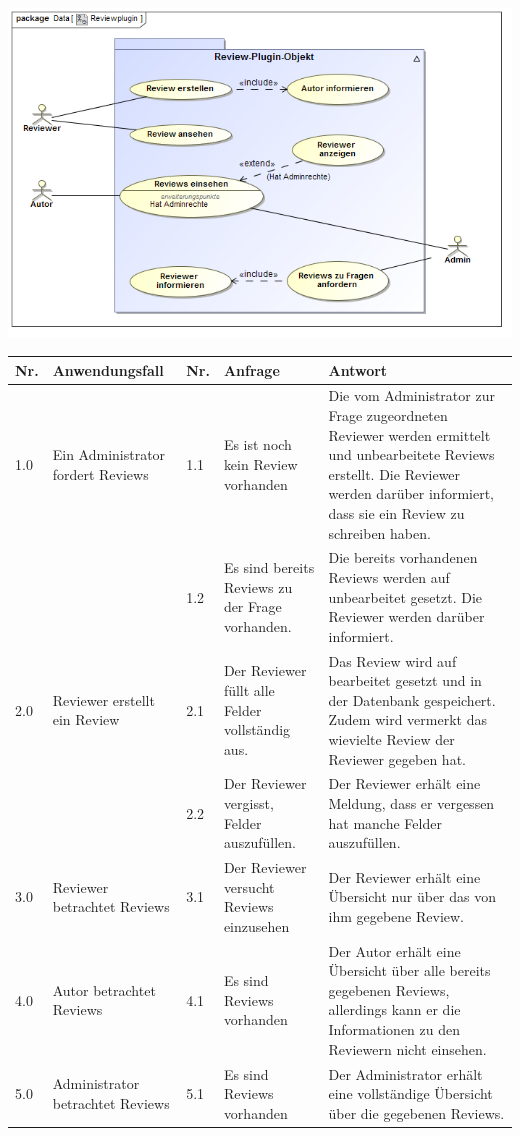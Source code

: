 \documentclass[a4paper]{scrreprt}
\begin{document}
\includegraphics[width=1.0\textwidth]{Use_Case_Diagram__Reviewplugin.png}
\label{Review}

\begin{tabular}{|p{0.5cm}|p{3cm}|p{0.5cm}|p{4cm}|p{4.5cm}|}\hline
Nr. & Anwendungsfall & Nr. & Anfrage & Antwort\\\hline
1.0 & Ein Administrator fordert Reviews & 1.1 & Es ist noch kein Review vorhanden & Die vom Administrator zur Frage zugeordneten Reviewer werden ermittelt und unbearbeitete Reviews erstellt. Die Reviewer werden darüber informiert, dass sie ein Review zu schreiben haben.\\\hline
&&1.2 & Es sind bereits Reviews zu der Frage vorhanden. & Die bereits vorhandenen Reviews werden auf unbearbeitet gesetzt. Die Reviewer werden darüber informiert.\\\hline
2.0 & Reviewer erstellt ein Review & 2.1 & Der Reviewer füllt alle Felder vollständig aus. & Das Review wird auf bearbeitet gesetzt und in der Datenbank gespeichert. Zudem wird vermerkt das wievielte Review der Reviewer gegeben hat.\\\hline
&&2.2 & Der Reviewer vergisst, Felder auszufüllen. & Der Reviewer erhält eine Meldung, dass er vergessen hat manche Felder auszufüllen. \\\hline
3.0 & Reviewer betrachtet Reviews & 3.1 & Der Reviewer versucht Reviews einzusehen & Der Reviewer erhält eine Übersicht nur über das von ihm gegebene Review. \\\hline
4.0 & Autor betrachtet Reviews & 4.1 & Es sind Reviews vorhanden & Der Autor erhält eine Übersicht über alle bereits gegebenen Reviews, allerdings kann er die Informationen zu den Reviewern nicht einsehen. \\\hline
5.0 & Administrator betrachtet Reviews & 5.1 & Es sind Reviews vorhanden & Der Administrator erhält eine vollständige Übersicht über die gegebenen Reviews. \\\hline
\end{tabular}
\end{document}
